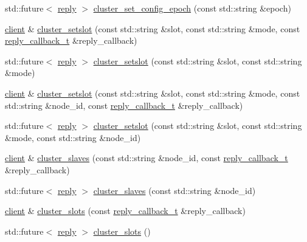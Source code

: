 \begin{DoxyCompactItemize}
\item 
std\+::future$<$ \hyperlink{classcpp__redis_1_1reply}{reply} $>$ \hyperlink{classcpp__redis_1_1client_a0be11e04ce58a13e2e40272be1fad788}{cluster\+\_\+set\+\_\+config\+\_\+epoch} (const std\+::string \&epoch)
\item 
\hyperlink{classcpp__redis_1_1client}{client} \& \hyperlink{classcpp__redis_1_1client_aeba14289869fe871eb9eb9c2503635a8}{cluster\+\_\+setslot} (const std\+::string \&slot, const std\+::string \&mode, const \hyperlink{classcpp__redis_1_1client_a061a1140d36d2eaeda82b09a0bb3f9f2}{reply\+\_\+callback\+\_\+t} \&reply\+\_\+callback)
\item 
std\+::future$<$ \hyperlink{classcpp__redis_1_1reply}{reply} $>$ \hyperlink{classcpp__redis_1_1client_ad9b75e2c90b1b87fa93a3ac76bd1512f}{cluster\+\_\+setslot} (const std\+::string \&slot, const std\+::string \&mode)
\item 
\hyperlink{classcpp__redis_1_1client}{client} \& \hyperlink{classcpp__redis_1_1client_a4e87a3163d16db267136a127e5c843e2}{cluster\+\_\+setslot} (const std\+::string \&slot, const std\+::string \&mode, const std\+::string \&node\+\_\+id, const \hyperlink{classcpp__redis_1_1client_a061a1140d36d2eaeda82b09a0bb3f9f2}{reply\+\_\+callback\+\_\+t} \&reply\+\_\+callback)
\item 
std\+::future$<$ \hyperlink{classcpp__redis_1_1reply}{reply} $>$ \hyperlink{classcpp__redis_1_1client_a824c1234198e48badeccf4190b610e32}{cluster\+\_\+setslot} (const std\+::string \&slot, const std\+::string \&mode, const std\+::string \&node\+\_\+id)
\item 
\hyperlink{classcpp__redis_1_1client}{client} \& \hyperlink{classcpp__redis_1_1client_ac03fb62a9eb5abbb5248bc38fd4dfb5e}{cluster\+\_\+slaves} (const std\+::string \&node\+\_\+id, const \hyperlink{classcpp__redis_1_1client_a061a1140d36d2eaeda82b09a0bb3f9f2}{reply\+\_\+callback\+\_\+t} \&reply\+\_\+callback)
\item 
std\+::future$<$ \hyperlink{classcpp__redis_1_1reply}{reply} $>$ \hyperlink{classcpp__redis_1_1client_afbfca7fb91f492768c7ac75677f433a2}{cluster\+\_\+slaves} (const std\+::string \&node\+\_\+id)
\item 
\hyperlink{classcpp__redis_1_1client}{client} \& \hyperlink{classcpp__redis_1_1client_a7d0dad34ca2fe2e301b202388bb47e10}{cluster\+\_\+slots} (const \hyperlink{classcpp__redis_1_1client_a061a1140d36d2eaeda82b09a0bb3f9f2}{reply\+\_\+callback\+\_\+t} \&reply\+\_\+callback)
\item 
std\+::future$<$ \hyperlink{classcpp__redis_1_1reply}{reply} $>$ \hyperlink{classcpp__redis_1_1client_a9dc222141ab85da05efbce7a7ff0a7d1}{cluster\+\_\+slots} ()

\end{DoxyCompactItemize}
